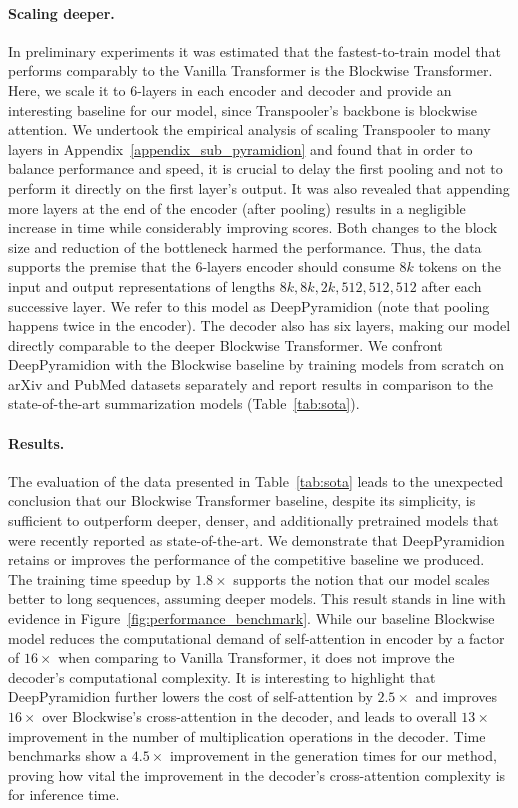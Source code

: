 \documentclass{article}
\begin{document}
\paragraph{Scaling deeper.} In preliminary experiments it was estimated that the fastest-to-train model that performs comparably to the Vanilla Transformer is the Blockwise Transformer. Here, we scale it to $6$-layers in each encoder and decoder and provide an interesting baseline for our model, since Transpooler's backbone is blockwise attention. 
We undertook the empirical analysis of scaling Transpooler to many layers in Appendix~\ref{appendix_sub_pyramidion} and found that in order to balance performance and speed, it is crucial to delay the first pooling and not to perform it directly on the first layer's output. It was also revealed that appending more layers at the end of the encoder (after pooling) results in a negligible increase in time while considerably improving scores. Both changes to the block size and reduction of the bottleneck harmed the performance. Thus, the data supports the premise that the $6$-layers encoder should consume $8k$ tokens on the input and output representations of lengths $8k,8k,2k,512,512,512$ after each successive layer. We refer to this model as DeepPyramidion (note that pooling happens twice in the encoder). The decoder also has six layers, making our model directly comparable to the deeper Blockwise Transformer. We confront DeepPyramidion with the Blockwise baseline by training models from scratch on arXiv and PubMed datasets separately and report results in comparison to the state-of-the-art summarization models (Table~\ref{tab:sota}).

\paragraph{Results.} 
 The evaluation of the data presented in Table~\ref{tab:sota} leads to the unexpected conclusion that our Blockwise Transformer baseline, despite its simplicity, is sufficient to outperform deeper, denser, and additionally pretrained models that were recently reported as state-of-the-art. We demonstrate that DeepPyramidion retains or improves the performance of the competitive baseline we produced. The training time speedup by $1.8\times$ supports the notion that our model scales better to long sequences, assuming deeper models. This result stands in line with evidence in Figure~\ref{fig:performance_benchmark}. While our baseline Blockwise model reduces the computational demand of self-attention in encoder by a factor of $16\times$ when comparing to Vanilla Transformer, it does not improve the decoder's computational complexity. It is interesting to highlight that DeepPyramidion further lowers the cost of self-attention by $2.5\times$ and improves $16\times$ over Blockwise's cross-attention in the decoder, and leads to overall $13\times$ improvement in the number of multiplication operations in the decoder.  Time benchmarks show a $4.5\times$ improvement in the generation times for our method, proving how vital the improvement in the decoder's cross-attention complexity is for inference time.
\end{document}
